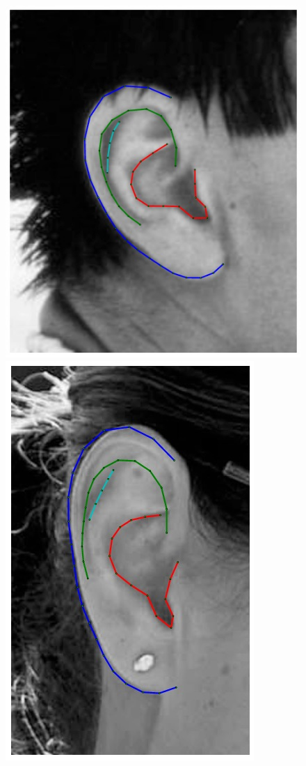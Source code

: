 \begin{figure}
\centering
\newcommand{\flowh}{0.29\columnwidth}
    \centering
    \includegraphics[height=\flowh]{resources/Ear_Deformable_Model/ear_02}
    \hfill
    \includegraphics[height=\flowh]{resources/Ear_Deformable_Model/ear_10}

\end{figure}
